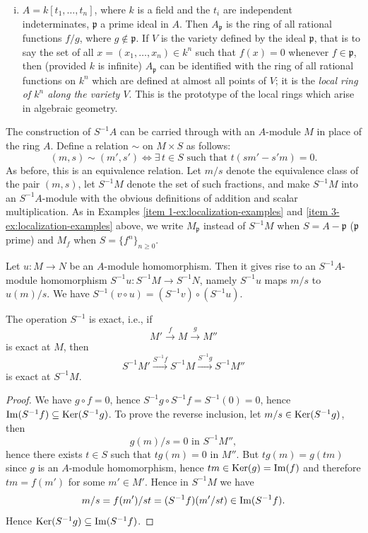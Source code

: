 \begin{examples}
\begin{enumerate}[(1)]
\begin{enumerate}[i)]
        \item $A = k[t_1, \ldots, t_n]$, where $k$ is a field and the $t_i$ are independent indeterminates, $\mathfrak{p}$ a prime ideal in $A$. Then $A_{\mathfrak{p}}$ is the ring of all rational functions $f/g$, where $g \notin \mathfrak{p}$. If $V$ is the variety defined by the ideal $\mathfrak{p}$, that is to say the set of all $x = (x_1, \ldots, x_n) \in k^n$ such that $f(x) = 0$ whenever $f \in \mathfrak{p}$, then (provided $k$ is infinite) $A_{\mathfrak{p}}$ can be identified with the ring of all rational functions on $k^n$ which are defined at almost all points of $V$; it is the \emph{local ring of $k^n$ along the variety $V$}. This is the prototype of the local rings which arise in algebraic geometry.
    \end{enumerate}
\end{enumerate}
\end{examples}

The construction of $S^{-1}A$ can be carried through with an $A$-module $M$ in place of the ring $A$. Define a relation $\sim$ on $M \times S$ as follows:
\[
    (m, s) \sim (m', s') \iff \exists\, t \in S \text{ such that } t(sm' - s'm) = 0.
\]
As before, this is an equivalence relation. Let $m/s$ denote the equivalence class of the pair $(m, s)$, let $S^{-1}M$ denote the set of such fractions, and make $S^{-1}M$ into an $S^{-1}A$-module with the obvious definitions of addition and scalar multiplication. As in Examples \eqref{item 1-ex:localization-examples} and \eqref{item 3-ex:localization-examples} above, we write $M_{\mathfrak{p}}$ instead of $S^{-1}M$ when $S = A - \mathfrak{p}$ ($\mathfrak{p}$ prime) and $M_f$ when $S = \{f^n\}_{n \geq 0}$.

Let $u \colon M \to N$ be an $A$-module homomorphism. Then it gives rise to an $S^{-1}A$-module homomorphism $S^{-1}u \colon S^{-1}M \to S^{-1}N$, namely $S^{-1}u$ maps $m/s$ to $u(m)/s$. We have $S^{-1}(v \circ u) = (S^{-1}v) \circ (S^{-1}u)$.

\begin{proposition}\label{prop:localization-exact}
The operation $S^{-1}$ is exact, i.e., if
\[
    M' \stackrel{f}{\longrightarrow} M \stackrel{g}{\longrightarrow} M''
\]
is exact at $M$, then
\[
    S^{-1}M' \xrightarrow{S^{-1}f} S^{-1}M \xrightarrow{S^{-1}g} S^{-1}M''
\]
is exact at $S^{-1}M$.
\end{proposition}

\begin{proof}
We have $g \circ f = 0$, hence $S^{-1}g \circ S^{-1}f = S^{-1}(0) = 0$, hence $\operatorname{Im}(S^{-1}f) \subseteq \operatorname{Ker}(S^{-1}g)$. To prove the reverse inclusion, let $m/s \in \operatorname{Ker}(S^{-1}g)$, then
\[
    g(m)/s = 0 \text{ in } S^{-1}M'',
\]
hence there exists $t \in S$ such that $tg(m) = 0$ in $M''$. But $tg(m) = g(tm)$ since $g$ is an $A$-module homomorphism, hence $tm \in \operatorname{Ker}(g) = \operatorname{Im}(f)$ and therefore $tm = f(m')$ for some $m' \in M'$. Hence in $S^{-1}M$ we have
\[
    m/s = f(m')/st = (S^{-1}f)(m'/st) \in \operatorname{Im}(S^{-1}f).
\]
Hence $\operatorname{Ker}(S^{-1}g) \subseteq \operatorname{Im}(S^{-1}f)$.
\end{proof}

